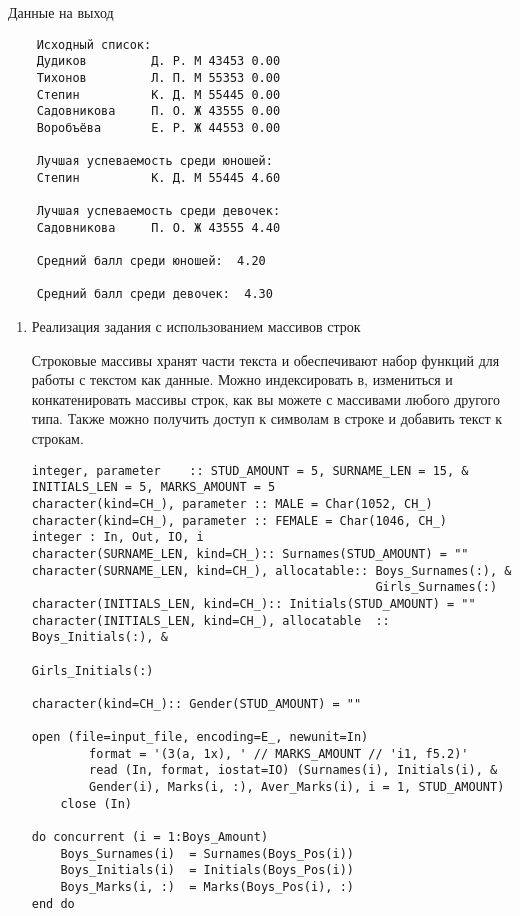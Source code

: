 \documentclass[a4paper,12pt]{extreport}
\begin{document}
Данные на выход

 \begin{verbatim}
    Исходный список:
    Дудиков         Д. Р. М 43453 0.00
    Тихонов         Л. П. М 55353 0.00
    Степин          К. Д. М 55445 0.00
    Садовникова     П. О. Ж 43555 0.00
    Воробъёва       Е. Р. Ж 44553 0.00
    
    Лучшая успеваемость среди юношей:
    Степин          К. Д. М 55445 4.60
    
    Лучшая успеваемость среди девочек:
    Садовникова     П. О. Ж 43555 4.40
    
    Средний балл среди юношей:  4.20
    
    Средний балл среди девочек:  4.30
\end{verbatim}

\begin{enumerate}
    \item Реализация задания с использованием массивов строк
    
Строковые массивы хранят части текста и обеспечивают набор функций для работы с текстом как данные. Можно индексировать в, измениться и конкатенировать массивы строк, как вы можете с массивами любого другого типа. Также можно получить доступ к символам в строке и добавить текст к строкам.    
    
         \begin{verbatim}
integer, parameter    :: STUD_AMOUNT = 5, SURNAME_LEN = 15, &
INITIALS_LEN = 5, MARKS_AMOUNT = 5
character(kind=CH_), parameter :: MALE = Char(1052, CH_) 
character(kind=CH_), parameter :: FEMALE = Char(1046, CH_) 
integer : In, Out, IO, i
character(SURNAME_LEN, kind=CH_):: Surnames(STUD_AMOUNT) = ""
character(SURNAME_LEN, kind=CH_), allocatable:: Boys_Surnames(:), &
                                                Girls_Surnames(:)
character(INITIALS_LEN, kind=CH_):: Initials(STUD_AMOUNT) = ""
character(INITIALS_LEN, kind=CH_), allocatable  :: Boys_Initials(:), &
                                                    Girls_Initials(:)

character(kind=CH_):: Gender(STUD_AMOUNT) = ""

open (file=input_file, encoding=E_, newunit=In)
        format = '(3(a, 1x), ' // MARKS_AMOUNT // 'i1, f5.2)' 
        read (In, format, iostat=IO) (Surnames(i), Initials(i), &
        Gender(i), Marks(i, :), Aver_Marks(i), i = 1, STUD_AMOUNT)
    close (In)

do concurrent (i = 1:Boys_Amount)
    Boys_Surnames(i)  = Surnames(Boys_Pos(i))
    Boys_Initials(i)  = Initials(Boys_Pos(i))
    Boys_Marks(i, :)  = Marks(Boys_Pos(i), :)
end do
   

\end{verbatim}
\end{enumerate}
\end{document}
